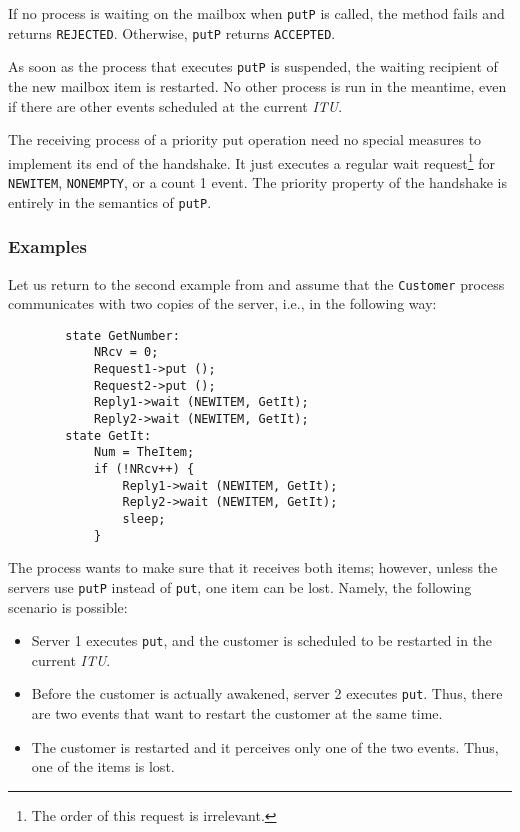 If no process is waiting on the mailbox when {\tt putP} is called,
the method fails and returns {\tt REJECTED}.
Otherwise, {\tt putP} returns {\tt ACCEPTED}.

As soon as the process that executes {\tt putP} is suspended, the
waiting recipient of the new mailbox item is restarted.
No other process is run
in the meantime, even if there are other events scheduled at the current
{\em ITU}.

The receiving process of a priority put operation need no
special measures to implement its end of the handshake.
It just executes a regular wait request\footnote{The order of this request
is irrelevant.} for {\tt NEWITEM}, {\tt NONEMPTY}, or a count 1 event.
The priority property of the handshake is entirely in the semantics of
{\tt putP}.

\subsubsection*{Examples}

\noindent
Let us return to the second example from  and assume that
the {\tt Customer} process communicates with two copies of
the server, i.e., in the following way:
\begin{verbatim}
        state GetNumber:
            NRcv = 0;
            Request1->put ();
            Request2->put ();
            Reply1->wait (NEWITEM, GetIt);
            Reply2->wait (NEWITEM, GetIt);
        state GetIt:
            Num = TheItem;
            if (!NRcv++) {
                Reply1->wait (NEWITEM, GetIt);
                Reply2->wait (NEWITEM, GetIt);
                sleep;
            }
\end{verbatim}

The process wants to make sure that it receives both items; however,
unless the servers use {\tt putP} instead of {\tt put}, one item
can be lost.
Namely, the following scenario is possible:
\begin{itemize}
\item
Server 1 executes {\tt put}, and the customer is scheduled to be restarted
in the current {\em ITU}.
\item
Before the customer is actually awakened, server 2 executes {\tt put}.
Thus, there are two events that want to restart the customer at the same
time.
\item
The customer is restarted and it perceives only one of the two events.
Thus, one of the items is lost.
\end{itemize}

